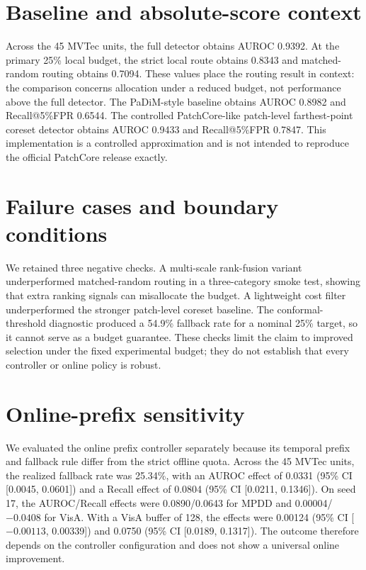 \documentclass[pdflatex,sn-basic,Numbered]{sn-jnl}
\begin{document}
\section{Baseline and absolute-score context}
Across the 45 MVTec units, the full detector obtains AUROC 0.9392. At the primary 25\% local budget, the strict local route obtains 0.8343 and matched-random routing obtains 0.7094. These values place the routing result in context: the comparison concerns allocation under a reduced budget, not performance above the full detector. The PaDiM-style baseline obtains AUROC 0.8982 and Recall@5\%FPR 0.6544. The controlled PatchCore-like patch-level farthest-point coreset detector obtains AUROC 0.9433 and Recall@5\%FPR 0.7847. This implementation is a controlled approximation and is not intended to reproduce the official PatchCore release exactly.

\section{Failure cases and boundary conditions}
We retained three negative checks. A multi-scale rank-fusion variant underperformed matched-random routing in a three-category smoke test, showing that extra ranking signals can misallocate the budget. A lightweight cost filter underperformed the stronger patch-level coreset baseline. The conformal-threshold diagnostic produced a 54.9\% fallback rate for a nominal 25\% target, so it cannot serve as a budget guarantee. These checks limit the claim to improved selection under the fixed experimental budget; they do not establish that every controller or online policy is robust.

\section{Online-prefix sensitivity}
We evaluated the online prefix controller separately because its temporal prefix and fallback rule differ from the strict offline quota. Across the 45 MVTec units, the realized fallback rate was 25.34\%, with an AUROC effect of 0.0331 (95\% CI [0.0045, 0.0601]) and a Recall effect of 0.0804 (95\% CI [0.0211, 0.1346]). On seed 17, the AUROC/Recall effects were 0.0890/0.0643 for MPDD and 0.00004/$-0.0408$ for VisA. With a VisA buffer of 128, the effects were 0.00124 (95\% CI [$-0.00113$, 0.00339]) and 0.0750 (95\% CI [0.0189, 0.1317]). The outcome therefore depends on the controller configuration and does not show a universal online improvement.
\end{document}

